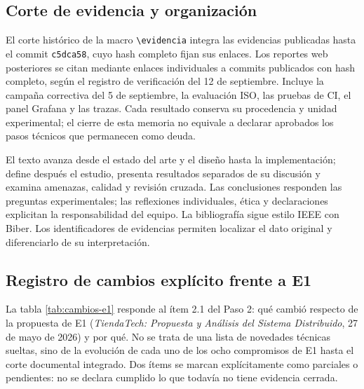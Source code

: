 \documentclass[12pt,a4paper]{article}
\begin{document}
\subsection{Corte de evidencia y organización}
El corte histórico de la macro \texttt{\textbackslash evidencia} integra las evidencias publicadas hasta el commit \texttt{c5dca58}, cuyo hash completo fijan sus enlaces. Los reportes web posteriores se citan mediante enlaces individuales a commits publicados con hash completo, según el registro de verificación del 12 de septiembre. Incluye la campaña correctiva del 5 de septiembre, la evaluación ISO, las pruebas de CI, el panel Grafana y las trazas. Cada resultado conserva su procedencia y unidad experimental; el cierre de esta memoria no equivale a declarar aprobados los pasos técnicos que permanecen como deuda.

El texto avanza desde el estado del arte y el diseño hasta la implementación; define después el estudio, presenta resultados separados de su discusión y examina amenazas, calidad y revisión cruzada. Las conclusiones responden las preguntas experimentales; las reflexiones individuales, ética y declaraciones explicitan la responsabilidad del equipo. La bibliografía sigue estilo IEEE con Biber. Los identificadores de evidencias permiten localizar el dato original y diferenciarlo de su interpretación.
\subsection{Registro de cambios explícito frente a E1}
La tabla \ref{tab:cambios-e1} responde al ítem 2.1 del Paso 2: qué cambió respecto de la propuesta de E1 (\emph{TiendaTech: Propuesta y Análisis del Sistema Distribuido}, 27 de mayo de 2026) y por qué. No se trata de una lista de novedades técnicas sueltas, sino de la evolución de cada uno de los ocho compromisos de E1 hasta el corte documental integrado. Dos ítems se marcan explícitamente como parciales o pendientes: no se declara cumplido lo que todavía no tiene evidencia cerrada.
\end{document}
